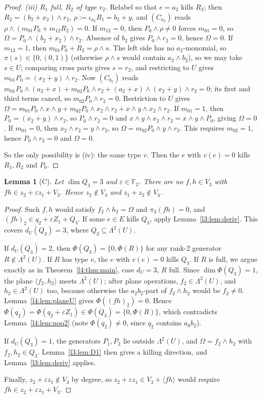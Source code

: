 \documentclass[11pt,a4paper]{article}
\theoremstyle{plain}
\newtheorem{lemma}[theorem]{Lemma}
\theoremstyle{remark}
\newcommand{\F}{\mathbb F_2}
\newcommand{\Lam}{\Lambda^2}
\newcommand{\dU}{d_U}
\begin{document}
\begin{proof}
\emph{(iii) $R_1$ full, $R_2$ of type $v_2$.} Relabel so that $e=a_2$ kills $R_2$; then $R_2=(b_2+x_2)\wedge r_2$, $\rho:=\iota_{a_2}R_1=b_2+y$, and $(C_{a_2})$ reads $\rho\wedge(m_{01}P_0+m_{12}R_2)=0$.
If $m_{12}=0$, then $P_0\wedge\rho\neq0$ forces $m_{01}=0$, so $\Omega=P_0\wedge(b_2+x_2)\wedge r_2$. Absence of $b_2$ gives $P_0\wedge r_2=0$, hence $\Omega=0$.
If $m_{12}=1$, then $m_{01}P_0+R_2=\rho\wedge s$. The left side has no $a_2$-monomial, so $\pi(s)\in\{0,(0,1)\}$ (otherwise $\rho\wedge s$ would contain $a_2\wedge b_2$), so we may take $s\in U$; comparing cross parts gives $s=r_2$, and restricting to $U$ gives $m_{01}P_0=(x_2+y)\wedge r_2$. Now $(C_{b_2})$ reads $m_{01}P_0\wedge(a_2+x)+m_{02}P_0\wedge r_2+(a_2+x)\wedge(x_2+y)\wedge r_2=0$; its first and third terms cancel, so $m_{02}P_0\wedge r_2=0$. Restriction to $U$ gives $\Omega=m_{01}P_0\wedge x\wedge y+m_{02}P_0\wedge x_2\wedge r_2+x\wedge y\wedge x_2\wedge r_2$.
If $m_{01}=1$, then $P_0=(x_2+y)\wedge r_2$, so $P_0\wedge r_2=0$ and $x\wedge y\wedge x_2\wedge r_2=x\wedge y\wedge P_0$, giving $\Omega=0$.
If $m_{01}=0$, then $x_2\wedge r_2=y\wedge r_2$, so $\Omega=m_{02}P_0\wedge y\wedge r_2$. This requires $m_{02}=1$, hence $P_0\wedge r_2=0$ and $\Omega=0$.

So the only possibility is (iv): the same type $v$. Then the $e$ with $v(e)=0$ kills $R_1,R_2$ and $P_0$.
\end{proof}

\begin{lemma}[C]\label{l3:lem:C}
Let $\dim Q_3=3$ and $\varepsilon\in\F$. There are no $f,h\in V_3$ with $fh\in z_2+\varepsilon z_1+V_3$. Hence $z_2\notin V_4$ and $z_1+z_2\notin V_4$.
\end{lemma}

\begin{proof}
Such $f,h$ would satisfy $f_2\wedge h_2=\Omega$ and $\pi_3(fh)=0$, and $(fh)_2\in q_2+\varepsilon Z_1+Q_3$. If some $e\in E$ kills $Q_3$, apply Lemma~\ref{l3:lem:deriv}. This covers $\dU(Q_3)=3$, where $Q_3\subseteq\Lam(U)$.

If $\dU(Q_3)=2$, then $\Phi(Q_3)=\{0,\Phi(R)\}$ for any rank-2 generator $R\notin\Lam(U)$. If $R$ has type $v$, the $e$ with $v(e)=0$ kills $Q_3$. If $R$ is full, we argue exactly as in Theorem~\ref{l4:thm:main}, case $\dU=3$, $R$ full. Since $\dim\Phi(Q_3)=1$, the plane $\langle f_2,h_2\rangle$ meets $\Lam(U)$; after plane operations, $f_2\in\Lam(U)$, and $h_2\in\Lam(U)$ too, because otherwise the $a_2b_2$-part of $f_2\wedge h_2$ would be $f_2\neq0$. Lemma~\ref{l4:lem:planeU} gives $\Phi((fh)_2)=0$. Hence $\Phi(q_2)=\Phi(q_2+\varepsilon Z_1)\in\Phi(Q_3)=\{0,\Phi(R)\}$, which contradicts Lemma~\ref{l4:lem:noq2} (note $\Phi(q_2)\neq0$, since $q_2$ contains $a_0b_2$).

If $\dU(Q_3)=1$, the generators $P_1,P_2$ lie outside $\Lam(U)$, and $\Omega=f_2\wedge h_2$ with $f_2,h_2\in Q_3$. Lemma~\ref{l3:lem:D1} then gives a killing direction, and Lemma~\ref{l3:lem:deriv} applies.

Finally, $z_2+\varepsilon z_1\notin V_3$ by degree, so $z_2+\varepsilon z_1\in V_3+\langle fh\rangle$ would require $fh\in z_2+\varepsilon z_1+V_3$.
\end{proof}
\end{document}
